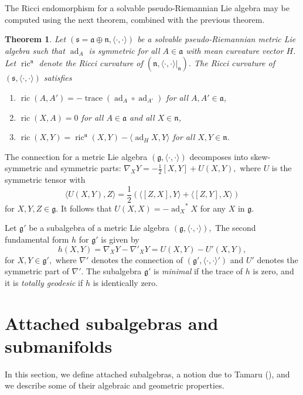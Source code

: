 \documentclass[12pt]{amsart}
\newcommand{\smallfrac}[2]{\textstyle{\frac{#1}{#2}}  }
\newcommand{\frakg}{\ensuremath{\mathfrak{g}} }
\newcommand{\frakn}{\ensuremath{\mathfrak{n}} }
\renewcommand\a{{\mathfrak{a}}}
\newcommand\n{{\mathfrak{n}}}
\newcommand\s{{\mathfrak{s}}}
\newcommand\ip{{\langle\cdot {,} \cdot\rangle}}
\newcommand\tr{\operatorname{trace}}
\newcommand\ad{\operatorname{ad}}
\newcommand\ric{\operatorname{ric}}
\theoremstyle{plain}
\newtheorem{theorem}{Theorem}
\theoremstyle{definition}
\theoremstyle{remark}
\numberwithin{equation}{section}
\numberwithin{theorem}{section}
\begin{document}
The Ricci  endomorphism for a solvable  pseudo-Riemannian  Lie
algebra  may be computed using the next theorem, combined with the previous theorem.
 \begin{theorem}\label{thm: Ricci}\cite{wolter-91,
     conti-rossi-22} 
   Let $(\s=\a \oplus \n, \ip)$
   be a solvable pseudo-Riemannian  metric Lie algebra such that  
   $\ad_A$ is symmetric for all $A \in \a$ 
   with mean curvature vector $H$.  Let 
   $ \ric^{\n}$ denote the Ricci curvature of $(\n, \ip|_{\frakn})$. The Ricci curvature of $(\s , \ip)$  satisfies 
 \begin{enumerate}
 \item[(1)] $\ric (A,A') = -\tr(\ad_A \circ \ad_{A'})$ for all $A,A' \in \a$,
\item[(2)]  $\ric (X,A) =0$ for all $A \in \a$ and all $X \in\n$,
 \item[(3)]  $\ric (X,Y) = \ric^{\n} (X,Y) - \langle \ad_{H} X,Y \rangle$ for all $X,Y \in \n$.
 \end{enumerate}
 \end{theorem}
 
The connection for a metric Lie algebra $(\frakg,\ip)$ decomposes  into skew-symmetric and symmetric parts: $\nabla_XY = -\tfrac 12[X,Y]+U(X,Y),$ where $U$ is the symmetric tensor with 
\begin{equation}\label{eqn: symm} \langle U(X,Y),Z\rangle = \smallfrac{1}{2}  (\langle[Z,X],Y\rangle + \langle [Z,Y],X\rangle)\end{equation} for  $X, Y, Z \in \frakg$.  
 It follows that 
 $ U(X,X)= -{\ad_X}^\ast X$ for any $X$ in $\frakg.$
 
 Let $\frakg'$ be a subalgebra of a metric Lie algebra $(\frakg,\ip),$
 The second fundamental form $h$  
for $\frakg'$ is given by $$h(X,Y) = \nabla_X Y - \nabla'_X Y =
U(X,Y) - U'(X,Y) ,$$ for $X,Y \in \frakg',$ where 
$\nabla'$ denotes the connection of $(\frakg', \ip')$
 and  $U'$ denotes the symmetric part of 
 $\nabla'$.
The subalgebra $\frakg'$  is {\em minimal} if the trace
of $h$ is zero, and it is {\em totally geodesic} if $h$ is
identically zero.

\section{Attached subalgebras and submanifolds}\label{section: attached}

In this section, we define attached subalgebras, a notion due to
Tamaru (\cite{tamaru-08}), and we describe some of their algebraic
and geometric properties.
\end{document}
